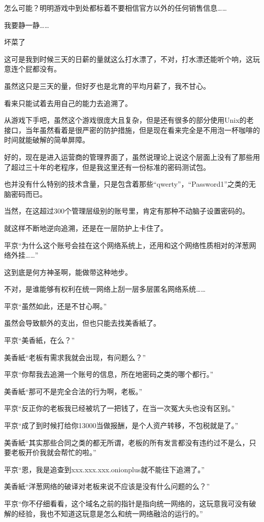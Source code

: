 怎么可能？明明游戏中到处都标着不要相信官方以外的任何销售信息……

我要静一静……

坏菜了

这可是我到时候三天的日薪的量就这么打水漂了，不对，打水漂还能听个响，这玩意连个屁都没有。

虽然这只是三天的量，但好歹也是北育的平均月薪了，我不甘心。

看来只能试着去用自己的能力去追溯了。

从游戏下手吧，虽然这个游戏很庞大且复杂，但是还有很多的部分使用Unix的老接口，当年虽然看着是很严密的防护措施，但是现在看来完全是不用泡一杯咖啡的时间就能破解的简单屏障。

好的，现在是进入运营商的管理界面了，虽然说理论上说这个层面上没有了那些用了超过三十年的老程序，但是我这里还有一份标准的密码测试包。

也并没有什么特别的技术含量，只是包含着那些“qwerty”，“Password1”之类的无脑密码而已。

当然，在这超过300个管理层级别的账号里，肯定有那种不动脑子设置密码的。

就这样不断地逆向追溯，还是在一层防护上卡住了。

平京“为什么这个账号会挂在这个网络系统上，还用和这个网络性质相对的洋葱网络外挂……”

这到底是何方神圣啊，能做带这种地步。

不对，是谁能够有权利在统一网络上刮一层多层匿名网络系统……

平京“虽然如此，还是不甘心啊。”

虽然会导致额外的支出，但也只能去找美香紙了。

平京“美香紙，在么？”

美香紙“老板有需求我就会出现，有问题么？”

平京“你帮我去追溯一个账号的信息，所在地密码之类的哪个都行。”

美香紙“那可不是完全合法的行为啊，老板。”

平京“反正你的老板我已经被坑了一把钱了，在当一次冤大头也没有区别。”

平京“成了到时候打给你13000当做报酬，是个人资产转移，不包税就是了。”

美香紙“其实那些合同之类的都无所谓，老板的所有发言都没有违约过不是么，只要老板开价我就会帮忙的啦。”

平京“恩，我是追查到xxx.xxx.xxx.onionplus就不能往下追溯了。”

美香紙“洋葱网络的破译对老板来说不应该是没有什么问题的么？”

平京“你不仔细看看，这个域名之前的指针是指向统一网络的，这玩意我可没有破解的经验，我也不知道这玩意是怎么和统一网络融洽的运行的。”

